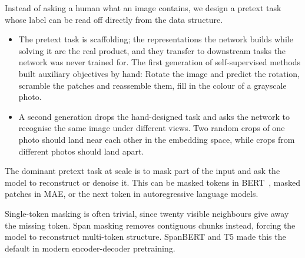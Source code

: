 Instead of asking a human what an image contains,
we design a pretext task whose label can be read off directly from the data structure.\\


\begin{itemize}
    \item {} The pretext task is scaffolding; the representations the network builds while solving it are the real product, and they transfer to downstream tasks the network was never trained for. The first generation of self-supervised methods built auxiliary objectives by hand: Rotate the image and predict the rotation, scramble the patches and reassemble them, fill in the colour of a grayscale photo.
    \item {} A second generation drops 
    the hand-designed task and asks the network to recognise the same image under different views.
    Two random crops of one photo should land near each other in the embedding space, while crops from 
    different photos should land apart.
\end{itemize}

The dominant pretext task at scale is to mask part of the input and ask the model to reconstruct or denoise it.
This can be masked tokens in BERT~\cite{Devlin2019BERT}, masked patches in MAE,
or the next token in autoregressive language models.

Single-token masking is often trivial,
since twenty visible neighbours give away the missing token.
Span masking removes contiguous chunks instead,
forcing the model to reconstruct multi-token structure.
SpanBERT and T5 made this the default in modern encoder-decoder pretraining.

